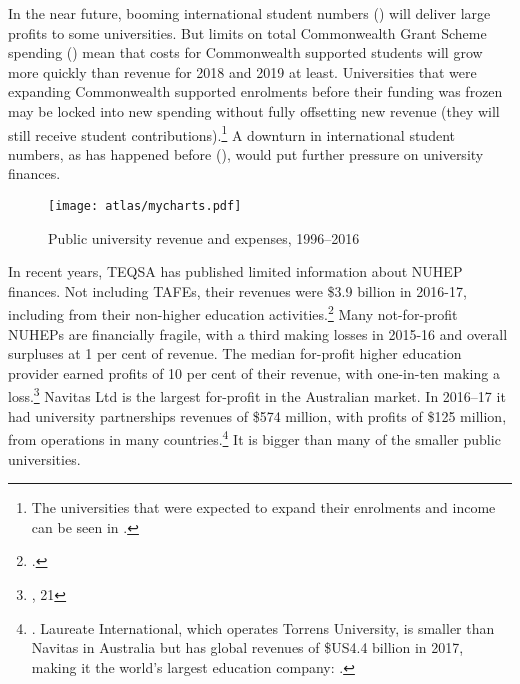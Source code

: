 \documentclass{grattan}
\begin{document}
In the near future, booming international student numbers () will deliver large profits to some universities. But limits on total Commonwealth Grant Scheme spending () mean that costs for Commonwealth supported students will grow more quickly than revenue for 2018 and 2019 at least. Universities that were expanding Commonwealth supported enrolments before their funding was frozen may be locked into new spending without fully offsetting new revenue (they will still receive student contributions).\footnote{The universities that were expected to expand their enrolments and income can be seen in \textcite[][]{Conifer2018universityfunding}.} A downturn in international student numbers, as has happened before (), would put further pressure on university finances.


    \begin{figure} %
    \caption{Public university revenue and expenses, 1996--2016}\label{fig:public-university-revenue-and-expenses-19962016}
    \texttt{[image: atlas/mycharts.pdf]}
    \end{figure}



In recent years, TEQSA has published limited information about NUHEP finances. Not including TAFEs, their revenues were \$3.9 billion in 2016-17, including from their non-higher education activities.\footcite[][45]{TEQSA2018teqsasriskassess} Many not-for-profit NUHEPs are financially fragile, with a third making losses in 2015-16 and overall surpluses at 1 per cent of revenue. The median for-profit higher education provider earned profits of 10 per cent of their revenue, with one-in-ten making a loss.\footnote{\textcite[][8]{TEQSA2017keymetricsonaust}, 21} Navitas Ltd is the largest for-profit in the Australian market. In 2016--17 it had university partnerships revenues of \$574 million, with profits of \$125 million, from operations in many countries.\footnote{\textcite[][67]{Navitas2017navitasannualrepo}. Laureate International, which operates Torrens University, is smaller than Navitas in Australia but has global revenues of \$US4.4 billion in 2017, making it the world's largest education company: \textcite[][]{LaureateEducation2018pressreleaselaur}.} It is bigger than many of the smaller public universities.
\end{document}
